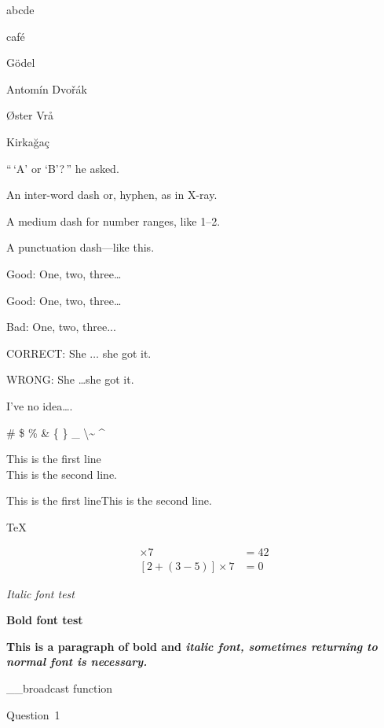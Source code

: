 \documentclass[11pt]{article}
\begin{document}
\textgreek{abcde}

caf\'e

G\"odel

Antom{\'i}n Dvo\v{r}\'ak

{\O}ster Vr\r{a}

Kirka\u{g}a\c{c}


``\,`A' or `B'?\,'' he asked.


An inter-word dash or, hyphen, as in X-ray.

A medium dash for number ranges, like 1--2.

A punctuation dash---like this.

Good: One, two, three\ldots

Good: One, two, three\dots

Bad: One, two, three...

CORRECT: She $\ldots$ she got it.

WRONG: She \ldots she got it.

I've no idea\ldots.

\# \quad \$ \quad \quad \quad \quad \quad \% \quad \& \quad
\{ \quad \} \quad \_ \quad
\textbackslash \quad \~{} \quad \^{}

This is the first line\\This is the second line.

This is the first line\linebreak This is the second line.

\TeX

\begin{align*}
    [2 - (3+5) + 1 + 2 + 3]\times 7 &= 42 \\{}
    [2 + (3-5)]\times 7 &= 0
\end{align*}

\textit{Italic font test}

{\bfseries Bold font test}

\sffamily
\textbf{This is a paragraph of bold and \textit{italic font, sometimes returning to \textnormal{normal font} is necessary.}}

\_\_broadcast function

Question~1
\end{document}
